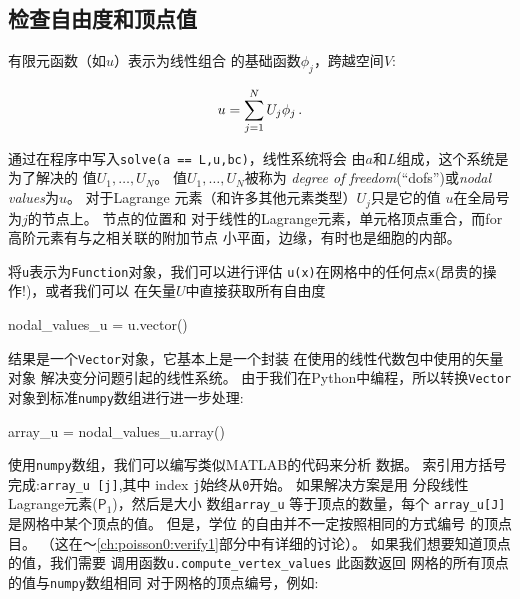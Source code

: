 \subsection{检查自由度和顶点值}
\label{ch:poisson0:impl:dofmap}


有限元函数（如$u$）表示为线性组合
的基础函数$\phi_j$，跨越空间$V$:

\begin{equation}
u = \sum_{j=1}^N U_j \phi_j \label{ch:poisson0:ufem}\tp
\end{equation}

通过在程序中写入\texttt{solve(a == L,u,bc)}，线性系统将会
由$a$和$L$组成，这个系统是为了解决的
值$U_1,\ldots,U_N$。 值$U_1,\ldots,U_N$被称为
\emph{degree of freedom}(``dofs'')或\emph{nodal values}为$u$。 对于Lagrange
元素（和许多其他元素类型）$U_j$只是它的值
$u$在全局号为$j$的节点上。 节点的位置和
对于线性的Lagrange元素，单元格顶点重合，而for
高阶元素有与之相关联的附加节点
小平面，边缘，有时也是细胞的内部。

将\texttt{u}表示为\texttt{Function}对象，我们可以进行评估
\texttt{u(x)}在网格中的任何点\texttt{x}(昂贵的操作!)，或者我们可以
在矢量$U$中直接获取所有自由度

\begin{python}
nodal_values_u = u.vector()
\end{python}
结果是一个\texttt{Vector}对象，它基本上是一个封装
在使用的线性代数包中使用的矢量对象
解决变分问题引起的线性系统。
由于我们在Python中编程，所以转换\texttt{Vector}
对象到标准\texttt{numpy}数组进行进一步处理:


\begin{python}
array_u = nodal_values_u.array()
\end{python}

使用\texttt{numpy}数组，我们可以编写类似MATLAB的代码来分析
数据。 索引用方括号完成:\verb!array_u [j]!,其中
index \texttt{j}始终从\texttt{0}开始。 如果解决方案是用
分段线性Lagrange元素($\mathsf{P}_1$)，然后是大小
数组\verb!array_u! 等于顶点的数量，每个
\verb!array_u[J]! 是网格中某个顶点的值。 但是，学位
的自由并不一定按照相同的方式编号
的顶点
目。 （这在〜\ref{ch:poisson0:verify1}部分中有详细的讨论）。
如果我们想要知道顶点的值，我们需要
调用函数\verb!u.compute_vertex_values! 此函数返回
网格的所有顶点的值与\texttt{numpy}数组相同
对于网格的顶点编号，例如:

